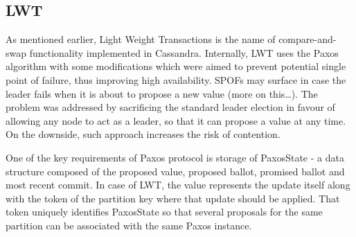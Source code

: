 %

\subsection{LWT}\label{sec:theory:transactions:lwt}
As mentioned earlier, Light Weight Transactions is the name of compare-and-swap functionality implemented in Cassandra. Internally, LWT uses the Paxos algorithm with some modifications which were aimed to prevent potential single point of failure, thus improving high availability. SPOFs may surface in case the leader fails when it is about to propose a new value (more on this…). The problem was addressed by sacrificing the standard leader election in favour of allowing any node to act as a leader, so that it can propose a value at any time. On the downside, such approach increases the risk of contention. 

One of the key requirements of Paxos protocol is storage of PaxosState - a data structure composed of the proposed value, proposed ballot, promised ballot and most recent commit. In case of LWT, the value represents the update itself along with the token of the partition key where that update should be applied. That token uniquely identifies PaxosState so that several proposals for the same partition can be associated with the same Paxos instance. 


